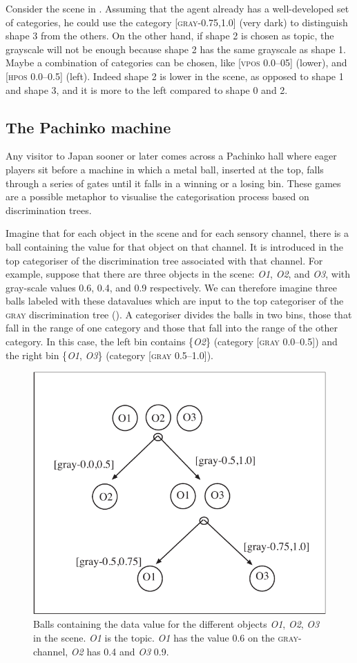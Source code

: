 Consider the scene in . Assuming that the agent
already has a well-developed set of categories, he could use 
the category [\textsc{gray}-0.75,1.0] (very dark) to distinguish 
shape 3 from the others. On the other hand, if shape 2 is 
chosen as topic, the grayscale will not be enough because
shape 2 has the same grayscale as shape 1. Maybe a 
combination of categories can be chosen, like [\textsc{vpos} 0.0–05]
(lower), and [\textsc{hpos} 0.0–0.5] (left). Indeed shape 2
is lower in the scene, as opposed to
shape 1 and shape 3, and it is more to the left compared 
to shape 0 and 2.

\subsection{The Pachinko machine}

Any visitor to Japan sooner or later comes across a 
Pachinko hall where eager players sit before a 
machine in which a metal ball, inserted at the top, 
falls through a series of gates until it falls in 
a winning or a losing bin. These games are
a possible metaphor to visualise the categorisation process
based on discrimination trees. 

Imagine that for each object in
the scene and for each sensory channel, there is a ball
containing the value for that object on that channel. It
is introduced in the top categoriser of the 
discrimination tree associated with that channel. 
For example, suppose that there are three
objects in the scene: \emph{O1}, \emph{O2}, and \emph{O3}, 
with gray-scale values 0.6, 0.4, and 0.9 respectively. 
We can therefore imagine three balls labeled with these datavalues
which are input to the top categoriser of the 
\textsc{gray} discrimination tree (). 
A categoriser divides the balls in two bins, 
those that fall in the range of 
one category and those that fall into the range of the other
category. In this case, the left bin contains \{\emph{O2}\} 
(category [\textsc{gray} 0.0–0.5]) 
and the right bin \{\emph{O1}, \emph{O3}\} (category [\textsc{gray} 0.5–1.0]). 

\begin{figure}[b]
  \centerline{\includegraphics[width=.65\textwidth]{chap4/figs/balls.pdf}}
\caption{\label{balls}Balls containing
the data value for the different objects
\emph{O1}, \emph{O2}, \emph{O3} in the scene. \emph{O1} is the topic.
\emph{O1} has the value 0.6 on the \textsc{gray}-channel, \emph{O2} has
0.4 and \emph{O3} 0.9.} 
\end{figure}

